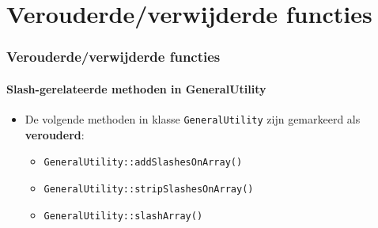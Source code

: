 %

\section{Verouderde/verwijderde functies}


\begin{frame}[fragile]
	\frametitle{Verouderde/verwijderde functies}
	\framesubtitle{Slash-gerelateerde methoden in GeneralUtility}

	\begin{itemize}

		\item De volgende methoden in klasse \texttt{GeneralUtility} zijn gemarkeerd als
			 \textbf{verouderd}:

			\begin{itemize}
				\item \texttt{GeneralUtility::addSlashesOnArray()}
				\item \texttt{GeneralUtility::stripSlashesOnArray()}
				\item \texttt{GeneralUtility::slashArray()}
			\end{itemize}

	\end{itemize}

\end{frame}


